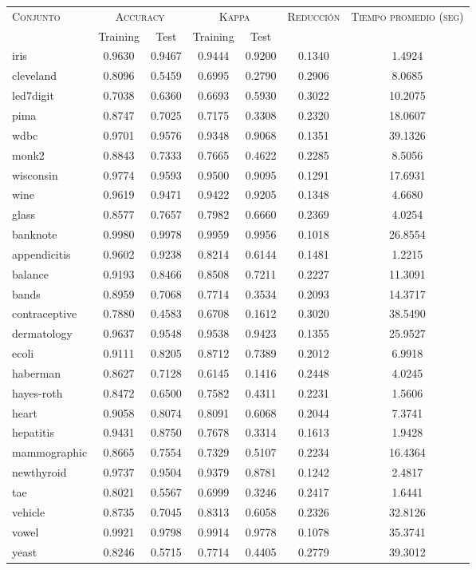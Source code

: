 \begin{table}[]
\centering
\begin{tabular}{l c c c c c c}
\hline
\multirow{2}{*}{\textsc{Conjunto}}
	& \multicolumn{2}{c}{\textsc{Accuracy}}
	& \multicolumn{2}{c}{\textsc{Kappa}}
	& \textsc{Reducción}
	& \textsc{Tiempo promedio (seg)} \\
	& Training & Test
	& Training & Test \\ 
\hline
\hline

iris & 0.9630 & 0.9467 & 0.9444 & 0.9200 & 0.1340 & 1.4924 \\
cleveland & 0.8096 & 0.5459 & 0.6995 & 0.2790 & 0.2906 & 8.0685 \\
led7digit & 0.7038 & 0.6360 & 0.6693 & 0.5930 & 0.3022 & 10.2075 \\
pima & 0.8747 & 0.7025 & 0.7175 & 0.3308 & 0.2320 & 18.0607 \\
wdbc & 0.9701 & 0.9576 & 0.9348 & 0.9068 & 0.1351 & 39.1326 \\
monk2 & 0.8843 & 0.7333 & 0.7665 & 0.4622 & 0.2285 & 8.5056 \\
wisconsin & 0.9774 & 0.9593 & 0.9500 & 0.9095 & 0.1291 & 17.6931 \\
wine & 0.9619 & 0.9471 & 0.9422 & 0.9205 & 0.1348 & 4.6680 \\
glass & 0.8577 & 0.7657 & 0.7982 & 0.6660 & 0.2369 & 4.0254 \\
banknote & 0.9980 & 0.9978 & 0.9959 & 0.9956 & 0.1018 & 26.8554 \\
appendicitis & 0.9602 & 0.9238 & 0.8214 & 0.6144 & 0.1481 & 1.2215 \\
balance & 0.9193 & 0.8466 & 0.8508 & 0.7211 & 0.2227 & 11.3091 \\
bands & 0.8959 & 0.7068 & 0.7714 & 0.3534 & 0.2093 & 14.3717 \\
contraceptive & 0.7880 & 0.4583 & 0.6708 & 0.1612 & 0.3020 & 38.5490 \\
dermatology & 0.9637 & 0.9548 & 0.9538 & 0.9423 & 0.1355 & 25.9527 \\
ecoli & 0.9111 & 0.8205 & 0.8712 & 0.7389 & 0.2012 & 6.9918 \\
haberman & 0.8627 & 0.7128 & 0.6145 & 0.1416 & 0.2448 & 4.0245 \\
hayes-roth & 0.8472 & 0.6500 & 0.7582 & 0.4311 & 0.2231 & 1.5606 \\
heart & 0.9058 & 0.8074 & 0.8091 & 0.6068 & 0.2044 & 7.3741 \\
hepatitis & 0.9431 & 0.8750 & 0.7678 & 0.3314 & 0.1613 & 1.9428 \\
mammographic & 0.8665 & 0.7554 & 0.7329 & 0.5107 & 0.2234 & 16.4364 \\
newthyroid & 0.9737 & 0.9504 & 0.9379 & 0.8781 & 0.1242 & 2.4817 \\
tae & 0.8021 & 0.5567 & 0.6999 & 0.3246 & 0.2417 & 1.6441 \\
vehicle & 0.8735 & 0.7045 & 0.8313 & 0.6058 & 0.2326 & 32.8126 \\
vowel & 0.9921 & 0.9798 & 0.9914 & 0.9778 & 0.1078 & 35.3741 \\
yeast & 0.8246 & 0.5715 & 0.7714 & 0.4405 & 0.2779 & 39.3012 \\


\end{tabular}
\end{table}
